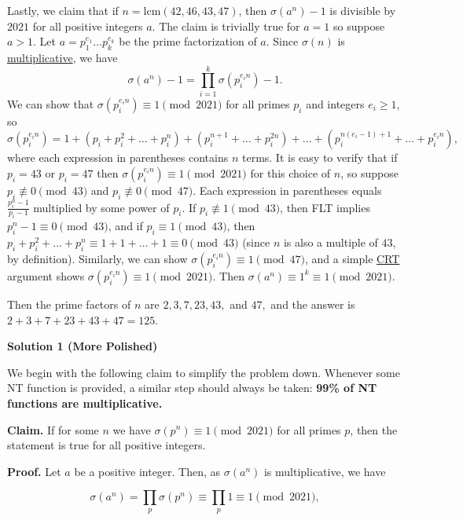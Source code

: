 \begin{enumerate}
 Lastly, we claim that if $n = \text{lcm}(42, 46, 43, 47)$, then $\sigma(a^n) - 1$ is divisible by $2021$ for all positive integers $a$. The claim is trivially true for $a=1$ so suppose $a>1$. Let $a = p_1^{e_1}\ldots p_k^{e_k}$ be the prime factorization of $a$. Since $\sigma(n)$ is \href{https://artofproblemsolving.com/wiki/index.php?title=Multiplicative\_function}{multiplicative}, we have
 \[\sigma(a^n) - 1 = \prod_{i=1}^k \sigma(p_i^{e_in}) - 1.\]We can show that $\sigma(p_i^{e_in}) \equiv 1 \pmod{2021}$ for all primes $p_i$ and integers $e_i \ge 1$, so
 \[\sigma(p_i^{e_in}) = 1 + (p_i + p_i^2 + \ldots + p_i^n) + (p_i^{n+1} + \ldots + p_i^{2n}) + \ldots + (p_i^{n(e_i-1)+1} + \ldots + p_i^{e_in}),\]where each expression in parentheses contains $n$ terms. It is easy to verify that if $p_i = 43$ or $p_i = 47$ then $\sigma(p_i^{e_in}) \equiv 1 \pmod{2021}$ for this choice of $n$, so suppose $p_i \not\equiv 0 \pmod{43}$ and $p_i \not\equiv 0 \pmod{47}$. Each expression in parentheses equals $\frac{p_i^n - 1}{p_i - 1}$ multiplied by some power of $p_i$. If $p_i \not\equiv 1 \pmod{43}$, then FLT implies $p_i^n - 1 \equiv 0 \pmod{43}$, and if $p_i \equiv 1 \pmod{43}$, then $p_i + p_i^2 + \ldots + p_i^n \equiv 1 + 1 + \ldots + 1 \equiv 0 \pmod{43}$ (since $n$ is also a multiple of $43$, by definition). Similarly, we can show $\sigma(p_i^{e_in}) \equiv 1 \pmod{47}$, and a simple \href{https://artofproblemsolving.com/wiki/index.php?title=Chinese\_Remainder\_Theorem}{CRT} argument shows $\sigma(p_i^{e_in}) \equiv 1 \pmod{2021}$. Then $\sigma(a^n) \equiv 1^k \equiv 1 \pmod{2021}$.

 Then the prime factors of $n$ are $2,3,7,23,43,$ and $47,$ and the answer is $2+3+7+23+43+47 = \boxed{125}$.

 



\textbf{Solution 1 (More Polished)}

We begin with the following claim to simplify the problem down. Whenever some NT function is provided, a similar step should always be taken: \textbf{99\% of NT functions are multiplicative.}

 \textbf{Claim.} If for some $n$ we have $\sigma(p^n)\equiv 1\pmod{2021}$ for all primes $p$, then the statement is true for all positive integers.

 
\textbf{Proof.} Let $a$ be a positive integer. Then, as $\sigma(a^n)$ is multiplicative, we have

 
 \[\sigma(a^n) = \prod_p \sigma(p^n) \equiv \prod_p 1 \equiv 1 \pmod{2021},\]


\end{enumerate}

